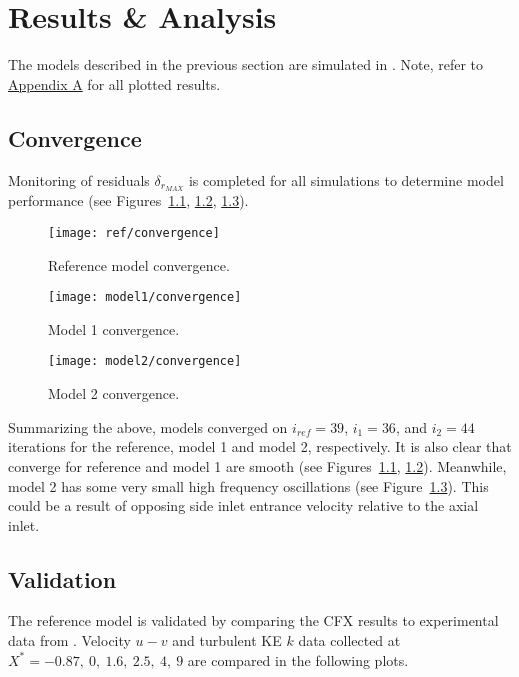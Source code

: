 \chapter{Results \& Analysis}
\label{ch:res}
The models described in the previous section are simulated in \cite{cfx}. Note, refer to \hyperlink{appendixa}{Appendix A} for all plotted results.

\section{Convergence}
\label{sec:convg}

Monitoring of residuals $\delta_{r_{MAX}}$ is completed for all simulations to determine model performance (see Figures~\ref{fig:ref_convg}, \ref{fig:mod1_convg}, \ref{fig:mod2_convg}).

\begin{figure}[H]
	\centering
	\texttt{[image: ref/convergence]}
	\caption{Reference model convergence.}
	\label{fig:ref_convg}
\end{figure}
\begin{figure}[H]
	\centering
	\texttt{[image: model1/convergence]}
	\caption{Model 1 convergence.}
	\label{fig:mod1_convg}
\end{figure}
\begin{figure}[H]
	\centering
	\texttt{[image: model2/convergence]}
	\caption{Model 2 convergence.}
	\label{fig:mod2_convg}
\end{figure}

Summarizing the above, models converged on $i_{ref}=39$, $i_1=36$, and $i_2=44$ iterations for the reference, model 1 and model 2, respectively. It is also clear that converge for reference and model 1 are smooth (see Figures~\ref{fig:ref_convg}, \ref{fig:mod1_convg}). Meanwhile, model 2  has some very small high frequency oscillations (see Figure~\ref{fig:mod2_convg}). This could be a result of opposing side inlet entrance velocity relative to the axial inlet.

\section{Validation}
\label{sec:valid}
The reference model is validated by comparing the CFX results to experimental data from \cite{art}. Velocity $u-v$ and turbulent KE $k$ data collected at $X^*=-0.87,\ 0,\ 1.6,\ 2.5,\ 4,\ 9$ are compared in the following plots.\\

